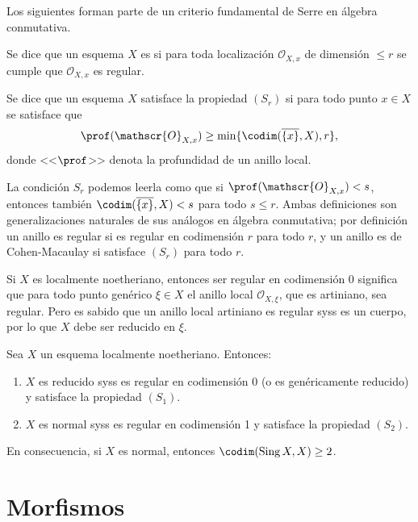 Los siguientes forman parte de un criterio fundamental de Serre en álgebra conmutativa.
\begin{mydef}
	Se dice que un esquema $X$ es %
	si para toda localización $\mathscr{O}_{X,x}$ de dimensión $\le r$ se cumple que $\mathscr{O}_{X, x}$ es regular.

	Se dice que un esquema $X$ satisface la propiedad $(S_r)$ si para todo punto $x \in X$ se satisface que
	$$ \prof(\mathscr{O}_{X, x}) \ge \min\{ \codim(\overline{\{ x \}}, X), r \}, $$
	donde <<$\prof$>> denota la profundidad de un anillo local.
\end{mydef}
La condición $S_r$ podemos leerla como que si $\prof(\mathscr{O}_{X, x}) < s$, entonces también $\codim( \overline{\{ x \}}, X ) < s$
para todo $s \le r$.
Ambas definiciones son generalizaciones naturales de sus análogos en álgebra conmutativa;
por definición un anillo es regular si es regular en codimensión $r$ para todo $r$, y un anillo es de Cohen-Macaulay si satisface $(S_r)$ para todo $r$.

Si $X$ es localmente noetheriano, entonces ser regular en codimensión 0 significa que para todo punto genérico $\xi \in X$
el anillo local $\mathscr{O}_{X, \xi}$, que es artiniano, sea regular.
Pero es sabido que un anillo local artiniano es regular syss es un cuerpo, por lo que $X$ debe ser reducido en $\xi$.

\begin{thm}
	Sea $X$ un esquema localmente noetheriano. Entonces:
	\begin{enumerate}
		\item $X$ es reducido syss es regular en codimensión 0 (o es genéricamente reducido) y satisface la propiedad $(S_1)$.
		\item $X$ es normal syss es regular en codimensión 1 y satisface la propiedad $(S_2)$.
	\end{enumerate}
	En consecuencia, si $X$ es normal, entonces $\codim(\Sing X, X) \ge 2$.
\end{thm}

\section{Morfismos}
